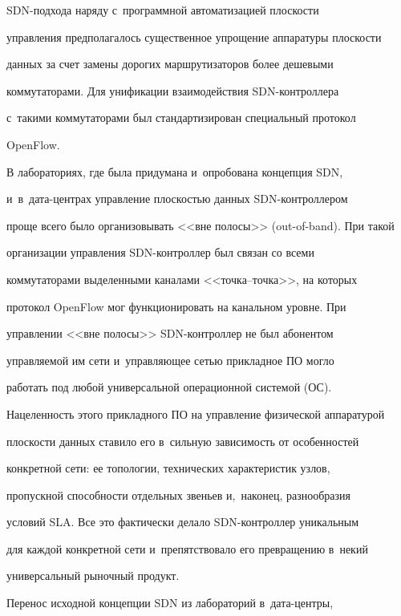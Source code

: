 SDN-под\-хо\-да наряду с~программной автоматизацией плос\-кости 


управления предполагалось существенное упрощение аппаратуры плос\-кости 


данных за счет замены дорогих маршрутизаторов более дешевыми 


коммутаторами. Для унификации взаимодействия SDN-конт\-рол\-ле\-ра 


с~такими коммутаторами был стандартизирован специальный протокол 


\mbox{OpenFlow}.


    


    В лабораториях, где была придумана и~опробована концепция SDN, 


и~в~да\-та-цент\-рах управ\-ле\-ние плос\-костью данных SDN-конт\-рол\-ле\-ром 


проще всего было организовывать <<вне полосы>> (out-of-band). При такой 


организации управ\-ле\-ния SDN-конт\-рол\-лер был связан со всеми 


коммутаторами выделенными каналами <<точ\-ка--точ\-ка>>, на которых 


протокол OpenFlow мог функционировать на канальном уровне. При 


управ\-ле\-нии <<вне полосы>> SDN-конт\-рол\-лер не был абонентом 


управ\-ля\-емой им сети и~управ\-ля\-ющее сетью прикладное ПО могло 


работать под любой универсальной операционной сис\-те\-мой (ОС). 


Нацеленность этого при\-клад\-но\-го ПО на управ\-ле\-ние физической аппаратурой 


плоскости данных ставило его в~сильную зависимость от особенностей 


конкретной сети: ее топологии, технических характеристик узлов, 


пропускной спо\-соб\-ности отдельных звень\-ев и,~наконец, разнообразия 


условий SLA. Все это фактически делало SDN-конт\-рол\-лер уникальным 


для каж\-дой конкретной сети и~препятствовало его превращению в~некий 


универсальный рыночный продукт.


    


    Перенос исходной концепции SDN из лабораторий в~да\-та-цент\-ры, 


